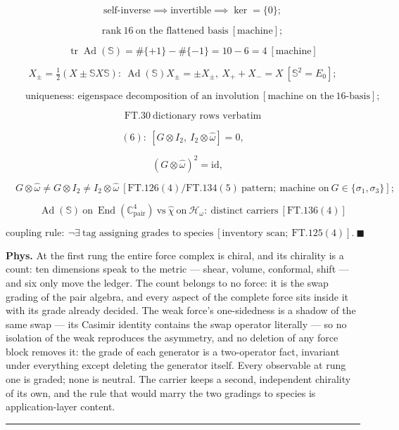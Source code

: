 \begin{theorem}
\[
\qquad \text{self-inverse}\implies\text{invertible}\implies\ker=\{0\};
\]

\[
\qquad \text{rank}\ 16\ \text{on the flattened basis}\ [\text{machine}];
\]

\[
\qquad \operatorname{tr}\operatorname{Ad}(\mathbb S)=\#\{+1\}-\#\{-1\}=10-6=4\ [\text{machine}]
\]

\[
X_{\pm}=\tfrac12(X\pm\mathbb SX\mathbb S):\ \operatorname{Ad}(\mathbb S)X_{\pm}=\pm X_{\pm},\ X_++X_-=X\ [\mathbb S^2=E_0];
\]

\[
\qquad \text{uniqueness: eigenspace decomposition of an involution}\ [\text{machine on the}\ 16\text{-basis}];
\]

\[
\qquad \mathrm{FT.30}\ \text{dictionary rows verbatim}
\]

\[
(6):\ [G\otimes I_2,\ I_2\otimes\hat\omega]=0,
\]

\[
\quad (G\otimes\hat\omega)^2=\mathrm{id},
\]

\[
\quad G\otimes\hat\omega\ne G\otimes I_2\ne I_2\otimes\hat\omega\ [\mathrm{FT.126}(4)/\mathrm{FT.134}(5)\ \text{pattern};\ \text{machine on}\ G\in\{\sigma_1,\sigma_3\}];
\]

\[
\qquad \operatorname{Ad}(\mathbb S)\ \text{on}\ \operatorname{End}(\mathbb C^4_{\mathrm{pair}})\ \text{vs}\ \hat\chi\ \text{on}\ \mathcal H_\omega:\ \text{distinct carriers}\ [\mathrm{FT.136}(4)]
\]

\[
\text{coupling rule}:\ \neg\exists\ \text{tag assigning grades to species}\ [\text{inventory scan};\ \mathrm{FT.125}(4)].\ \blacksquare
\]

\textbf{Phys.} At the first rung the entire force complex is chiral, and its chirality is a count: ten dimensions speak to the metric — shear, volume, conformal, shift — and six only move the ledger. The count belongs to no force: it is the swap grading of the pair algebra, and every aspect of the complete force sits inside it with its grade already decided. The weak force's one-sidedness is a shadow of the same swap — its Casimir identity contains the swap operator literally — so no isolation of the weak reproduces the asymmetry, and no deletion of any force block removes it: the grade of each generator is a two-operator fact, invariant under everything except deleting the generator itself. Every observable at rung one is graded; none is neutral. The carrier keeps a second, independent chirality of its own, and the rule that would marry the two gradings to species is application-layer content.

\vspace{2pt}\noindent\rule{\textwidth}{0.4pt}\vspace{2pt}

\end{theorem}

